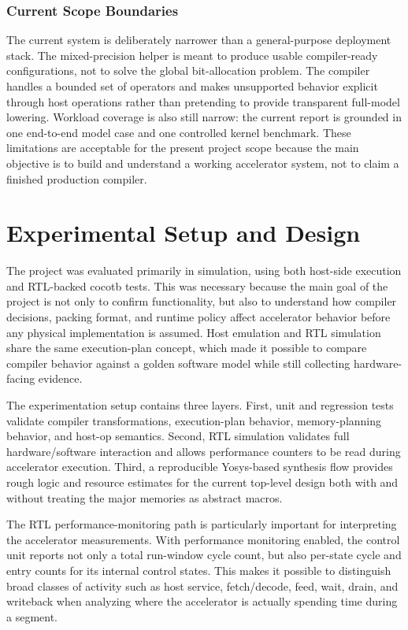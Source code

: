 \documentclass[a4paper, 12pt, titlepage]{article}
\begin{document}
\subsubsection{Current Scope Boundaries}
The current system is deliberately narrower than a general-purpose deployment stack. The mixed-precision helper is meant to produce usable compiler-ready configurations, not to solve the global bit-allocation problem. The compiler handles a bounded set of operators and makes unsupported behavior explicit through host operations rather than pretending to provide transparent full-model lowering. Workload coverage is also still narrow: the current report is grounded in one end-to-end model case and one controlled kernel benchmark. These limitations are acceptable for the present project scope because the main objective is to build and understand a working accelerator system, not to claim a finished production compiler.

\newpage
\section{Experimental Setup and Design} 
The project was evaluated primarily in simulation, using both host-side execution and RTL-backed cocotb tests. This was necessary because the main goal of the project is not only to confirm functionality, but also to understand how compiler decisions, packing format, and runtime policy affect accelerator behavior before any physical implementation is assumed. Host emulation and RTL simulation share the same execution-plan concept, which made it possible to compare compiler behavior against a golden software model while still collecting hardware-facing evidence.

The experimentation setup contains three layers. First, unit and regression tests validate compiler transformations, execution-plan behavior, memory-planning behavior, and host-op semantics. Second, RTL simulation validates full hardware/software interaction and allows performance counters to be read during accelerator execution. Third, a reproducible Yosys-based synthesis flow provides rough logic and resource estimates for the current top-level design both with and without treating the major memories as abstract macros.

The RTL performance-monitoring path is particularly important for interpreting the accelerator measurements. With performance monitoring enabled, the control unit reports not only a total run-window cycle count, but also per-state cycle and entry counts for its internal control states. This makes it possible to distinguish broad classes of activity such as host service, fetch/decode, feed, wait, drain, and writeback when analyzing where the accelerator is actually spending time during a segment.
\end{document}
